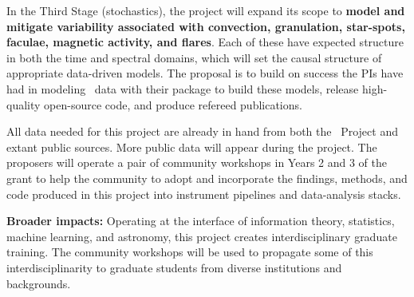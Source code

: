 \documentclass[12pt, fullpage, letterpaper]{article}
\begin{document}
In the Third Stage (stochastics), the project will expand its scope to
\textbf{model and mitigate variability associated with convection, granulation,
star-spots, faculae, magnetic activity, and
flares}. Each of these have expected structure in both the time and
spectral domains, which will set the causal structure of appropriate
data-driven models. The proposal is to build on success the PIs have
had in modeling \EPRV\ data with their  package to build these
models, release high-quality open-source code, and produce refereed
publications.

All data needed for this project are already in hand from both the
\EXPRES\ Project and extant public
sources. More public data will appear during the project.
The proposers will operate a pair of community workshops in
Years 2 and 3 of the grant to help the community to adopt and
incorporate the findings, methods, and code produced in this project
into instrument pipelines and data-analysis stacks.

\textbf{Broader impacts:}
Operating at the interface of information theory, statistics, machine learning,
and astronomy, this project creates interdisciplinary graduate training.
The community workshops will be used to propagate some of this interdisciplinarity
to graduate students from diverse institutions and backgrounds.
\end{document}
